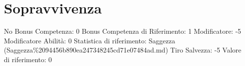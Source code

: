 \section{Sopravvivenza}\label{sopravvivenza}

\begin{description}
\tightlist
\item[Tags: ABI]
No Bonus Competenza: 0 Bonus Competenza di Riferimento: 1 Modificatore:
-5 Modificatore Abilità: 0 Statistica di riferimento: Saggezza
(Saggezza\%2094456b890ea247348245cd71e07484ad.md) Tiro Salvezza: -5
Valore di riferimento: 0
\end{description}
